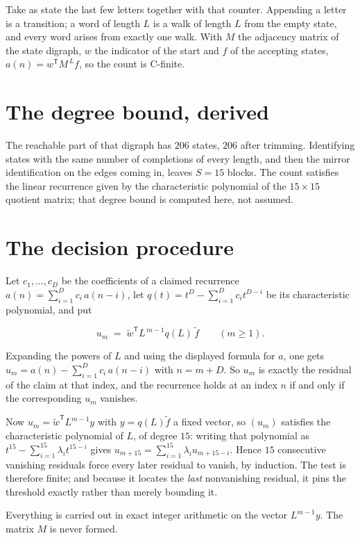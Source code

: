 \documentclass[11pt]{article}
\theoremstyle{definition}
\begin{document}
Take as state the last few letters together with that counter. Appending a letter is a transition; a word of length $L$ is a walk of length $L$ from the empty state, and every word arises from exactly one walk. With $M$ the adjacency matrix of the state digraph, $w$ the indicator of the start and $f$ of the accepting states, $a(n) = w^{\mathsf T}M^{\,L}f$, so the count is C-finite.

\section{The degree bound, derived}

The reachable part of that digraph has $206$ states, $206$ after trimming. Identifying states with the same number of completions of every length, and then the mirror identification on the edges coming in, leaves $S = 15$ blocks. The count satisfies the linear recurrence given by the characteristic polynomial of the $15\times15$ quotient matrix; that degree bound is computed here, not assumed.

\section{The decision procedure}

Let $c_1,\dots,c_D$ be the coefficients of a claimed recurrence $a(n) = \sum_{i=1}^{D} c_i\,a(n-i)$, let $q(t) = t^{D} - \sum_{i=1}^{D} c_i t^{D-i}$ be its characteristic polynomial, and put

\[u_m \;=\; \tilde w^{\mathsf T} L^{\,m-1} q(L)\,\tilde f \qquad (m \ge 1).\]

Expanding the powers of $L$ and using the displayed formula for $a$, one gets $u_m = a(n) - \sum_{i=1}^{D} c_i\,a(n-i)$ with $n = m + D$. So $u_m$ is exactly the residual of the claim at that index, and the recurrence holds at an index $n$ if and only if the corresponding $u_m$ vanishes.

Now $u_m = \tilde w^{\mathsf T} L^{m-1} y$ with $y = q(L)\tilde f$ a fixed vector, so $(u_m)$ satisfies the characteristic polynomial of $L$, of degree $15$: writing that polynomial as $t^{15} - \sum_{i=1}^{15} \lambda_i t^{15-i}$ gives $u_{m+15} = \sum_{i=1}^{15} \lambda_i u_{m+15-i}$. Hence $15$ consecutive vanishing residuals force every later residual to vanish, by induction. The test is therefore finite; and because it locates the {\itshape last} nonvanishing residual, it pins the threshold exactly rather than merely bounding it.

Everything is carried out in exact integer arithmetic on the vector $L^{m-1}y$. The matrix $M$ is never formed.
\end{document}

